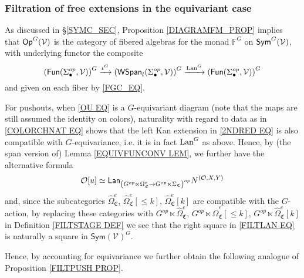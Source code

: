 \documentclass[a4paper,10pt
,draft
]{article}%
\renewcommand{\1}{\eta}%
\begin{document}
\subsubsection{Filtration of free extensions in the equivariant case}

As discussed in \S \ref{SYMC_SEC},
Proposition \ref{DIAGRAMFM_PROP} implies that $\mathsf{Op}^G(\mathcal V)$ is the category of fibered algebras for the monad $\mathbb F^G$ on $\mathsf{Sym}^G(\mathcal V)$,
with underlying functor the composite
\[
      \left(
            \mathsf{Fun}(\Sigma^{op}_{\bullet}, \mathcal V)
      \right)^G
      \xrightarrow{\iota^G}
      \left(
            \mathsf{WSpan}_l
            (\Sigma^{op}_{\bullet},\mathcal{V})
      \right)^G
      \xrightarrow{\operatorname{Lan}^G}
      \left(
            \mathsf{Fun}
            (\Sigma^{op}_{\bullet},\mathcal{V})
      \right)^G
\]
and given on each fiber by \eqref{FGC_EQ}.
      
For pushouts, when \eqref{OU EQ} is a $G$-equivariant diagram (note that the maps are still assumed the identity on colors),
naturality with regard to data as in \eqref{COLORCHNAT EQ}
shows that the left Kan extension in 
\eqref{2NDRED EQ} 
is also compatible with $G$-equivariance, i.e. it is in fact $\operatorname{Lan}^G$ as above.
Hence, by (the span version of) Lemma \ref{EQUIVFUNCONV LEM},
we further have the alternative formula
\begin{equation}\label{3RDRED EQ}
\mathcal{O}[u] \simeq
	\mathsf{Lan}_{\left(G^{op} \ltimes \Omega_{\mathfrak C}^{e} \to
	G^{op} \ltimes \Sigma_{\mathfrak C}\right)^{op}} N^{(\mathcal{O},X,Y)}
\end{equation}
and, since the subcategories 
$\widehat{\Omega}_{\mathfrak{C}}^e$,
$\widehat{\Omega}_{\mathfrak{C}}^e[\leq k]$,
$\widehat{\Omega}_{\mathfrak{C}}^e[k]$
are compatible with the $G$-action, by replacing these categories with 
$G^{op} \ltimes \widehat{\Omega}_{\mathfrak{C}}^e$,
$G^{op} \ltimes \widehat{\Omega}_{\mathfrak{C}}^e[\leq k]$,
$G^{op} \ltimes \widehat{\Omega}_{\mathfrak{C}}^e[k]$
in Definition \ref{FILTSTAGE DEF}
we see that the right square in \eqref{FILTLAN EQ}
is naturally a square in 
$\mathsf{Sym}(\mathcal{V})^G$.

Hence, by accounting for equivariance
we further obtain the following analogue of 
Proposition \ref{FILTPUSH PROP}.
\end{document}

